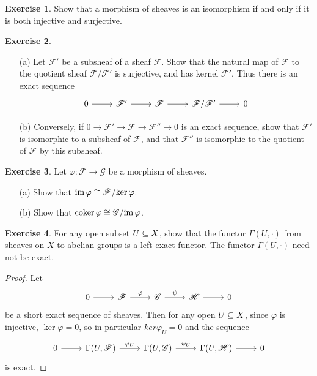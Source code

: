 \documentclass[11pt]{book}
\theoremstyle{definition}
\newtheorem{exercise}{Exercise}[section]
\begin{document}
\begin{exercise}
Show that a morphism of sheaves is an isomorphism if and only if it is both injective and surjective.
\end{exercise}
\begin{exercise}
\mbox{}
\begin{itemize}
\item[(a)] Let $\mathscr{F}'$ be a subsheaf of a sheaf $\mathscr{F}$. Show that the natural map of $\mathscr{F}$ to the quotient sheaf $\mathscr{F}/\mathscr{F}'$ is surjective, and has kernel $\mathscr{F}'$. Thus there is an exact sequence
\[\begin{tikzcd}
0\ar[r]&\mathscr{F}'\ar[r]&\mathscr{F}\ar[r]&\mathscr{F}/\mathscr{F}'\ar[r]&0
\end{tikzcd}\] 
\item[(b)] Conversely, if $0\to\mathscr{F}'\to\mathscr{F}\to\mathscr{F}''\to 0$ is an exact sequence, show that $\mathscr{F}'$ is isomorphic to a subsheaf of $\mathscr{F}$, and that $\mathscr{F}''$ is isomorphic to the quotient of $\mathscr{F}$ by this subsheaf.
\end{itemize}
\end{exercise}
\begin{exercise}
Let $\varphi:\mathscr{F}\to\mathscr{G}$ be a morphism of sheaves.
\begin{itemize}
\item[(a)] Show that $\mathrm{im}\,\varphi\cong\mathscr{F}/\mathrm{ker}\,\varphi$.
\item[(b)] Show that $\mathrm{coker}\,\varphi\cong\mathscr{G}/\mathrm{im}\,\varphi$.
\end{itemize}
\end{exercise}
\begin{exercise}
For any open subset $U\subseteq X$, show that the functor $\Gamma(U,\cdot)$ from sheaves on $X$ to abelian groups is a left exact functor. The functor $\Gamma(U,\cdot)$ need not be exact.
\end{exercise}
\begin{proof}
Let
\[\begin{tikzcd}
0\ar[r]&\mathscr{F}\ar[r,"\varphi"]&\mathscr{G}\ar[r,"\psi"]&\mathscr{H}\ar[r]&0
\end{tikzcd}\]
be a short exact sequence of sheaves. Then for any open $U\subseteq X$, since $\varphi$ is injective, $\ker\varphi=0$, so in particular $ker\varphi_U=0$ and the sequence
\[\begin{tikzcd}
0\ar[r]&\Gamma(U,\mathscr{F})\ar[r,"\varphi_U"]&\Gamma(U,\mathscr{G})\ar[r,"\psi_U"]&\Gamma(U,\mathscr{H})\ar[r]&0
\end{tikzcd}\]
is exact.
\end{proof}
\end{document}
